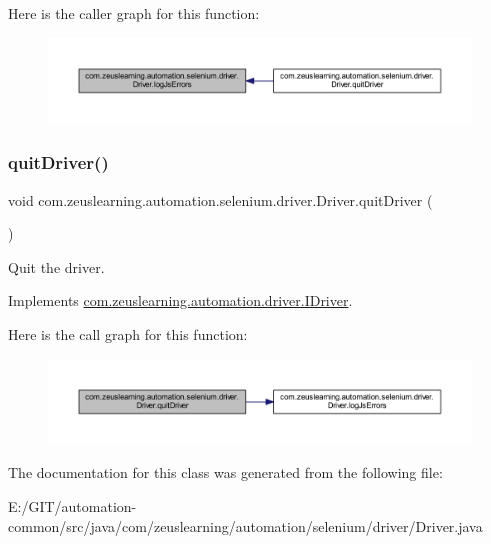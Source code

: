 Here is the caller graph for this function\+:
\nopagebreak
\begin{figure}[H]
\begin{center}
\leavevmode
\includegraphics[width=350pt]{d7/dcc/classcom_1_1zeuslearning_1_1automation_1_1selenium_1_1driver_1_1Driver_a5e4cf6f7ea41db7d15f35aaa1052bd0f_icgraph}
\end{center}
\end{figure}
\hypertarget{classcom_1_1zeuslearning_1_1automation_1_1selenium_1_1driver_1_1Driver_aa185026e032362e2cbfa14b583cf7d48}{}\label{classcom_1_1zeuslearning_1_1automation_1_1selenium_1_1driver_1_1Driver_aa185026e032362e2cbfa14b583cf7d48} 
\subsubsection{\texorpdfstring{quit\+Driver()}{quitDriver()}}
{\footnotesize\ttfamily void com.\+zeuslearning.\+automation.\+selenium.\+driver.\+Driver.\+quit\+Driver (\begin{DoxyParamCaption}{ }\end{DoxyParamCaption})\hspace{0.3cm}{\ttfamily [inline]}}

Quit the driver. 

Implements \hyperlink{interfacecom_1_1zeuslearning_1_1automation_1_1driver_1_1IDriver_abf28b69bbf3db2e4f4727c3498ccde0f}{com.\+zeuslearning.\+automation.\+driver.\+I\+Driver}.

Here is the call graph for this function\+:
\nopagebreak
\begin{figure}[H]
\begin{center}
\leavevmode
\includegraphics[width=350pt]{d7/dcc/classcom_1_1zeuslearning_1_1automation_1_1selenium_1_1driver_1_1Driver_aa185026e032362e2cbfa14b583cf7d48_cgraph}
\end{center}
\end{figure}


The documentation for this class was generated from the following file\+:\begin{DoxyCompactItemize}
\item 
E\+:/\+G\+I\+T/automation-\/common/src/java/com/zeuslearning/automation/selenium/driver/Driver.\+java\end{DoxyCompactItemize}
